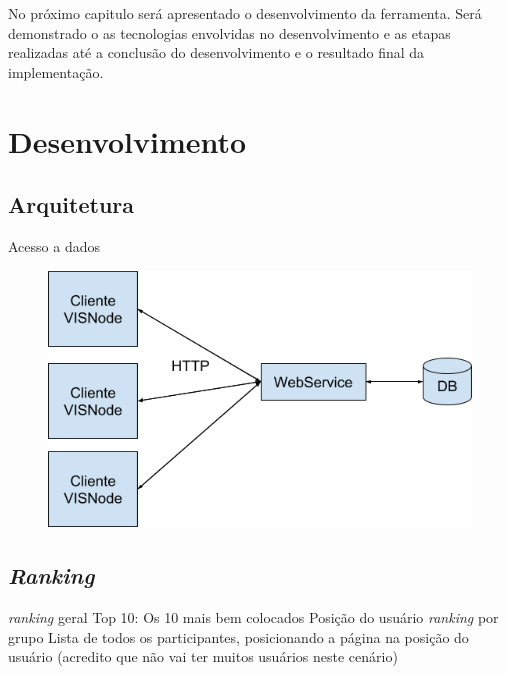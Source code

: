 \documentclass[
	12pt,				%
	oneside,			%
	a4paper,			%
	english,			%
	french,				%
	spanish,			%
	brazil,				%
	]{abntex2}
\begin{document}
No próximo capitulo será apresentado o desenvolvimento da ferramenta. Será demonstrado o as tecnologias envolvidas no desenvolvimento e as etapas realizadas até a conclusão do desenvolvimento e o resultado final da implementação.

\chapter{Desenvolvimento} 


\section{Arquitetura}
Acesso a dados

\begin{figure}[ht]
\centering
\includegraphics[width=1\textwidth]{imagens/visnode_arquitetura.png}
\end{figure}

\section{\textit{Ranking}}

\textit{ranking} geral
Top 10: Os 10 mais bem colocados 
Posição do usuário
\textit{ranking} por grupo
Lista de todos os participantes, posicionando a página na posição do usuário (acredito que não vai ter muitos usuários neste cenário) 
\end{document}
